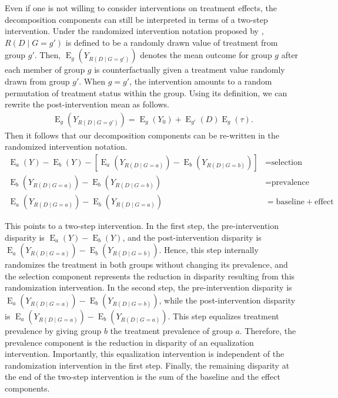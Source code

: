 \documentclass[12pt,a4paper]{article}
\newcommand{\E}{\operatorname{E}}
\begin{document}
Even if one is not willing to consider interventions on treatment effects, the decomposition components can still be interpreted in terms of a two-step intervention. Under the randomized intervention notation proposed by \citet{didelez_direct_2006}, $R(D \mid  G=g')$ is defined to be a randomly drawn value of treatment from group $g'$. Then, $\E_g \left(Y_{R(D \mid  G=g') } \right)$ denotes the mean outcome for group $g$ after each member of group $g$ is counterfactually given a treatment value randomly drawn from  group $g'$. When $g=g'$, the intervention amounts to a random permutation of treatment status within the group. Using its definition, we can rewrite the post-intervention mean as follows.
\begin{align}
    \E_g \left(Y_{R(D \mid  G=g') } \right) = \E_g (Y_0) + \E_{g'}(D)\E_g(\tau). \label{eqt2}
\end{align}
Then it follows that our decomposition components can be re-written in the randomized intervention notation.
\begin{align*}
   \E_a(Y) - \E_b(Y) - \left[ \E_a \left(Y_{R(D \mid G=a)} \right) - \E_b \left(Y_{R(D \mid G=b)}\right) \right] &= \text{selection} \\
   \E_b \left(Y_{R(D \mid G=a)} \right)-\E_b \left(Y_{R(D \mid G=b)} \right)  &= \text{prevalence} \\
   \E_a \left(Y_{R(D \mid G=a)} \right)-\E_b \left(Y_{R(D \mid G=a)} \right)  &= \text{baseline} + \text{effect} 
\end{align*}

This points to a two-step intervention. In the first step, the pre-intervention disparity is $\E_a(Y) - \E_b(Y)$, and the post-intervention disparity is $\E_a \left(Y_{R(D \mid G=a)} \right) - \E_b \left(Y_{R(D \mid G=b)}\right)$. Hence, this step internally randomizes the treatment in both groups without changing its prevalence, and the selection component represents the reduction in disparity resulting from this randomization intervention. In the second step, the pre-intervention disparity is $\E_a \left(Y_{R(D \mid G=a)} \right) - \E_b \left(Y_{R(D \mid G=b)}\right)$, while the post-intervention disparity is $\E_a \left(Y_{R(D \mid G=a)} \right)-\E_b \left(Y_{R(D \mid G=a)} \right)$. This step equalizes treatment prevalence by giving group $b$ the treatment prevalence of group $a$. Therefore, the prevalence component is the reduction in disparity of an equalization intervention. Importantly, this equalization intervention is independent of the randomization intervention in the first step. Finally, the remaining disparity at the end of the two-step intervention is the sum of the baseline and the effect components. 
\end{document}
